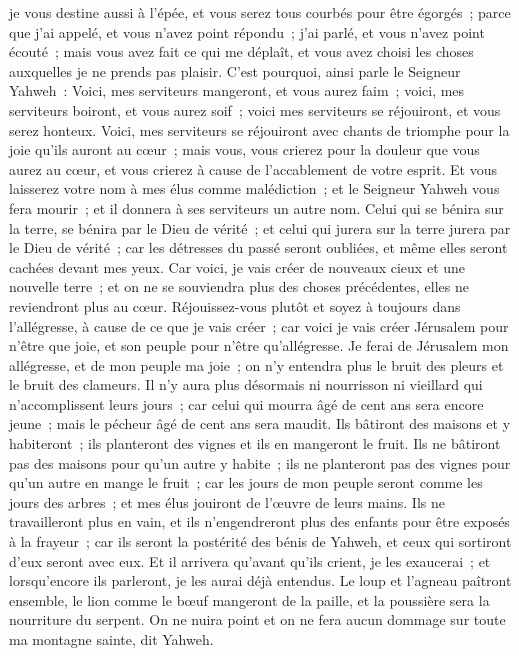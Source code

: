 \begin{multicols}{2}
je vous destine aussi à l'épée, et vous serez tous courbés pour être égorgés~; parce que j'ai appelé, et vous n'avez point répondu~; j'ai parlé, et vous n'avez point écouté~; mais vous avez fait ce qui me déplaît, et vous avez choisi les choses auxquelles je ne prends pas plaisir.
C'est pourquoi, ainsi parle le Seigneur Yahweh~: Voici, mes serviteurs mangeront, et vous aurez faim~; voici, mes serviteurs boiront, et vous aurez soif~; voici mes serviteurs se réjouiront, et vous serez honteux.
Voici, mes serviteurs se réjouiront avec chants de triomphe pour la joie qu'ils auront au cœur~; mais vous, vous crierez pour la douleur que vous aurez au cœur, et vous crierez à cause de l'accablement de votre esprit.
Et vous laisserez votre nom à mes élus comme malédiction~; et le Seigneur Yahweh vous fera mourir~; et il donnera à ses serviteurs un autre nom.
Celui qui se bénira sur la terre, se bénira par le Dieu de vérité~; et celui qui jurera sur la terre jurera par le Dieu de vérité~; car les détresses du passé seront oubliées, et même elles seront cachées devant mes yeux.
Car voici, je vais créer de nouveaux cieux et une nouvelle terre~; et on ne se souviendra plus des choses précédentes, elles ne reviendront plus au cœur.
Réjouissez-vous plutôt et soyez à toujours dans l'allégresse, à cause de ce que je vais créer~; car voici je vais créer Jérusalem pour n'être que joie, et son peuple pour n'être qu'allégresse.
Je ferai de Jérusalem mon allégresse, et de mon peuple ma joie~; on n'y entendra plus le bruit des pleurs et le bruit des clameurs.
Il n'y aura plus désormais ni nourrisson ni vieillard qui n'accomplissent leurs jours~; car celui qui mourra âgé de cent ans sera encore jeune~; mais le pécheur âgé de cent ans sera maudit.
Ils bâtiront des maisons et y habiteront~; ils planteront des vignes et ils en mangeront le fruit.
Ils ne bâtiront pas des maisons pour qu'un autre y habite~; ils ne planteront pas des vignes pour qu'un autre en mange le fruit~; car les jours de mon peuple seront comme les jours des arbres~; et mes élus jouiront de l'œuvre de leurs mains.
Ils ne travailleront plus en vain, et ils n'engendreront plus des enfants pour être exposés à la frayeur~; car ils seront la postérité des bénis de Yahweh, et ceux qui sortiront d'eux seront avec eux.
Et il arrivera qu'avant qu'ils crient, je les exaucerai~; et lorsqu'encore ils parleront, je les aurai déjà entendus.
Le loup et l'agneau paîtront ensemble, le lion comme le bœuf mangeront de la paille, et la poussière sera la nourriture du serpent. On ne nuira point et on ne fera aucun dommage sur toute ma montagne sainte, dit Yahweh.

\end{multicols}
